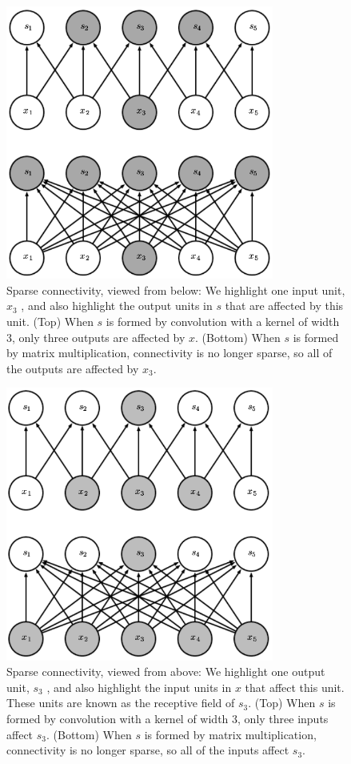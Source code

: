 \documentclass{report}
\begin{document}
\begin{figure}[ht]
	\includegraphics[width=250pt]{28}
	\centering
	\caption{Sparse connectivity, viewed from below: We highlight one input unit, $x_3$ , and also highlight the output units in $s$ that are affected by this unit. (Top) When $s$ is formed by convolution with a kernel of width 3, only three outputs are affected by $x$. (Bottom) When $s$ is formed by matrix multiplication, connectivity is no longer sparse, so all of the outputs are aﬀected by $x_3$.}
\end{figure}

\begin{figure}[ht]
	\includegraphics[width=250pt]{29}
	\centering
	\caption{Sparse connectivity, viewed from above: We highlight one output unit, $s_3$ , and also highlight the input units in $x$ that affect this unit. These units are known as the receptive ﬁeld of $s_3$. (Top) When $s$ is formed by convolution with a kernel of width 3, only three inputs affect $s_3$. (Bottom) When $s$ is formed by matrix multiplication, connectivity is no longer sparse, so all of the inputs aﬀect $s_3$.}
\end{figure}
\end{document}
